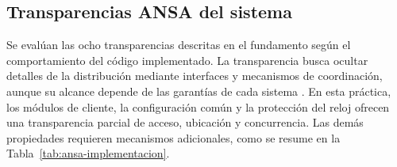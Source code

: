 \subsection{Transparencias ANSA del sistema}
\label{sec:ansa-sistema}

Se evalúan las ocho transparencias descritas en el fundamento según el
comportamiento del código implementado. La transparencia busca ocultar detalles
de la distribución mediante interfaces y mecanismos de coordinación, aunque su
alcance depende de las garantías de cada sistema
\cite[pp.~11--15]{belinda_vansteen2023_distributed}.
En esta práctica, los módulos de cliente, la configuración común y la protección
del reloj ofrecen una transparencia parcial de acceso, ubicación y concurrencia.
Las demás propiedades requieren mecanismos adicionales, como se resume en la
Tabla~\ref{tab:ansa-implementacion}.

